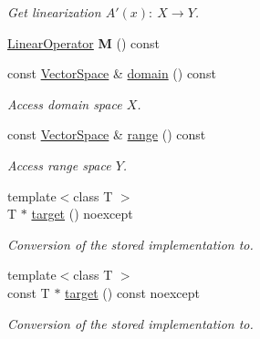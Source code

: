 \begin{DoxyCompactItemize}
\begin{DoxyCompactList}\small\item\em Get linearization $A'(x):\ X\to Y $. \end{DoxyCompactList}\item 
\hyperlink{classSpacy_1_1LinearOperator}{Linear\+Operator} {\bfseries M} () const \hypertarget{classSpacy_1_1DynamicC1Operator_a8bef5bf8f2a8dd4e16ba39da1bda78d3}{}\label{classSpacy_1_1DynamicC1Operator_a8bef5bf8f2a8dd4e16ba39da1bda78d3}

\item 
const \hyperlink{classSpacy_1_1VectorSpace}{Vector\+Space} \& \hyperlink{classSpacy_1_1DynamicC1Operator_ac8633283f219699d6a696e866f98fed6}{domain} () const \hypertarget{classSpacy_1_1DynamicC1Operator_ac8633283f219699d6a696e866f98fed6}{}\label{classSpacy_1_1DynamicC1Operator_ac8633283f219699d6a696e866f98fed6}

\begin{DoxyCompactList}\small\item\em Access domain space $X$. \end{DoxyCompactList}\item 
const \hyperlink{classSpacy_1_1VectorSpace}{Vector\+Space} \& \hyperlink{classSpacy_1_1DynamicC1Operator_a15daaabb27566457a0a3df02a13f9d96}{range} () const \hypertarget{classSpacy_1_1DynamicC1Operator_a15daaabb27566457a0a3df02a13f9d96}{}\label{classSpacy_1_1DynamicC1Operator_a15daaabb27566457a0a3df02a13f9d96}

\begin{DoxyCompactList}\small\item\em Access range space $Y$. \end{DoxyCompactList}\item 
{\footnotesize template$<$class T $>$ }\\T $\ast$ \hyperlink{classSpacy_1_1DynamicC1Operator_a2a1bdf1b5ccc6876ab2698d60318a5a6}{target} () noexcept
\begin{DoxyCompactList}\small\item\em Conversion of the stored implementation to. \end{DoxyCompactList}\item 
{\footnotesize template$<$class T $>$ }\\const T $\ast$ \hyperlink{classSpacy_1_1DynamicC1Operator_ae1685f9300539256df1fece193c7fa7b}{target} () const noexcept
\begin{DoxyCompactList}\small\item\em Conversion of the stored implementation to. \end{DoxyCompactList}\end{DoxyCompactItemize}


